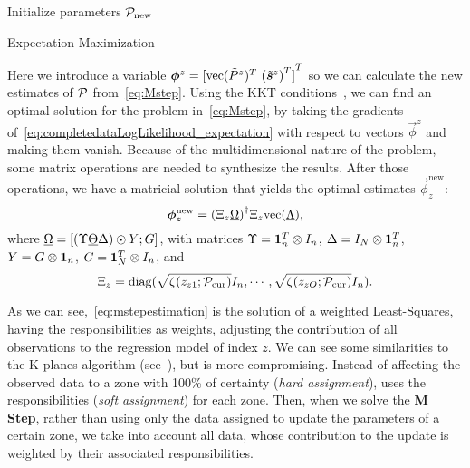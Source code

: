\documentclass{ifacconf}  %
\begin{document}
\begin{algorithm2e}[h]
  \DontPrintSemicolon%
  Initialize parameters $\mathcal{P}_{\mathrm{new}}$\;
 \caption{Expectation Maximization}\label{alg:em}
\end{algorithm2e}

Here we introduce a variable ${\vec{\phi}^{z}={[\vectorize{\tilde{P}^{z}}^{T}\ {(\tilde{\vec{s}}^{z})}^{T} ]}^{T}}$ so we can calculate the new estimates of $\mathcal{P}$ from~\eqref{eq:Mstep}. Using the KKT conditions~\cite{BoydVandenberghe2004}, we can find an optimal solution for the problem in~\eqref{eq:Mstep}, by
taking the gradients of~\eqref{eq:completedataLogLikelihood_expectation} with respect to vectors $\vec{\phi}^{z}$ and making them vanish.
Because of the multidimensional nature of the problem, some matrix operations are needed to synthesize the results.
After those operations, we have a matricial solution that yields the optimal estimates $\vec{\phi}_{z}^{\mathrm{new}}$:
\begin{equation}
  \label{eq:mstepestimation}
  \boldsymbol{\phi}_{z}^{\mathrm{new}}={(\Xi_{z}\underline{\Omega})}^{\dagger}\Xi_{z}\mathrm{vec} (\underline{\Lambda}),
\end{equation}
where
${\underline{\Omega}=[(\Upsilon \underline{\Theta}\Delta)\odot Y;G]}$,
with matrices
${\Upsilon=\mathbf{1}_{n}^{T}\mathbin{\otimes}I_{n}}$,
${\Delta=I_{N}\mathbin{\otimes}\mathbf{1}_{n}^{T}}$,
${Y=G\mathbin{\otimes}\mathbf{1}_{n}}$,
${G=\mathbf{1}_{N}^{T}\mathbin{\otimes}I_{n}}$,
and
\[{\Xi_{z}={\operatorname{diag}(\sqrt{{\zeta(z_{z1};\mathcal{P}_{\mathrm{cur}})}}I_{n},\cdots,\sqrt{{\zeta(z_{zO};\mathcal{P}_{\mathrm{cur}})}}I_{n})}}.\]

As we can see,~\eqref{eq:mstepestimation} is the solution of a weighted Least-Squares, having the responsibilities as weights, adjusting the contribution of all observations to the regression model of index $z$.
We can see some similarities to the K-planes algorithm (see~\cite{BradleyMangasarian2000}), but \EM{} is more compromising.
Instead of affecting the observed data to a zone with 100\% of certainty (\emph{hard assignment}), \EM{} uses the responsibilities (\emph{soft assignment}) for each zone.
Then, when we solve the \textbf{M Step}, rather than using only the data assigned to update the parameters of a certain zone, we take into account all data, whose contribution to the update is weighted by their associated responsibilities.
\end{document}
